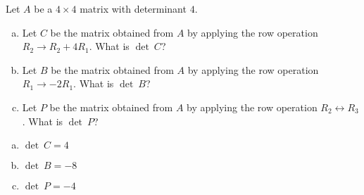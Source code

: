 
\begin{exerciseStatement}


Let \(A\) be a \(4 \times 4\) matrix with determinant \( 4 \).


\begin{enumerate}[(a)]
\item Let \(C\) be the matrix obtained from \(A\) by applying the row operation \( R_2 \to R_2 + 4R_1 \). What is \(\operatorname{det}\ C\)?
\item Let \(B\) be the matrix obtained from \(A\) by applying the row operation \( R_1 \to -2R_1 \). What is \(\operatorname{det}\ B\)?
\item Let \(P\) be the matrix obtained from \(A\) by applying the row operation \( R_2 \leftrightarrow R_3 \). What is \(\operatorname{det}\ P\)?
\end{enumerate}
    
\end{exerciseStatement}
    
\begin{exerciseAnswer} 

\begin{enumerate}[(a)]
\item \(\operatorname{det}\ C= 4 \)
\item \(\operatorname{det}\ B= -8 \)
\item \(\operatorname{det}\ P= -4 \)
\end{enumerate}
    
\end{exerciseAnswer}
    
